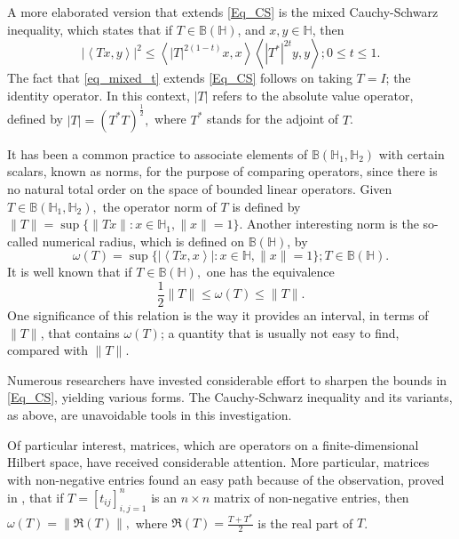 \documentclass[12pt,twoside,reqno]{amsart}
\numberwithin{equation}{section}
\begin{document}
A more elaborated version that extends \eqref{Eq_CS} is the  mixed Cauchy-Schwarz inequality, which states that if $T\in\mathbb{B}(\mathbb{H})$, and $x,y\in\mathbb{H}$, then \cite{kato}
\begin{equation}\label{eq_mixed_t}
{{\left| \left\langle Tx,y \right\rangle  \right|}^{2}}\le \left\langle {{\left| T \right|}^{2\left( 1-t \right)}}x,x \right\rangle \left\langle {{\left| {{T}^{*}} \right|}^{2t}}y,y \right\rangle; 0\leq t\leq 1.
\end{equation}
The fact that \eqref{eq_mixed_t} extends \eqref{Eq_CS} follows on taking $T=I$; the identity operator. In this context, $|T|$ refers to the absolute value operator, defined by $|T|=(T^*T)^{\frac{1}{2}},$ where $T^*$ stands for the adjoint of $T$.

It has been a common practice to associate elements of $\mathbb{B}(\mathbb{H}_1,\mathbb{H}_2)$ with certain scalars, known as norms, for the purpose of comparing operators, since there is no natural total order on the space of bounded linear operators. Given $T\in\mathbb{B}(\mathbb{H}_1,\mathbb{H}_2),$ the operator norm of $T$  is defined by $\|T\|=\sup\{\|Tx\|:x\in\mathbb{H}_1,\|x\|=1\}.$ Another interesting norm is the so-called numerical radius, which is defined on $\mathbb{B}(\mathbb{H})$, by
\[\omega(T)=\sup\{|\left<Tx,x\right>|:x\in\mathbb{H},\|x\|=1\}; T\in\mathbb{B}(\mathbb{H}).\]
It is well known that if $T\in\mathbb{B}(\mathbb{H}),$ one has the equivalence \cite[Theorem 1.3-1]{Gustafson_Book_1997}
\begin{equation}\label{Eq_Equiv}
\frac{1}{2}\|T\|\leq\omega(T)\leq \|T\|.
\end{equation}
One significance of this relation is the way it provides an interval, in terms of $\|T\|$, that contains $\omega(T)$; a quantity that is usually not easy to find, compared with $\|T\|.$ 

Numerous researchers have invested considerable effort to sharpen the bounds in \eqref{Eq_CS}, yielding various forms. The Cauchy-Schwarz inequality and its variants, as above, are unavoidable tools in this investigation.

Of particular interest, matrices, which are operators on a finite-dimensional Hilbert space, have received considerable attention. More particular, matrices with non-negative entries found an easy path because of the observation, proved in \cite{Goldberg_LAA_1975}, that if $T=[t_{ij}]_{i,j=1}^{n}$ is an $n\times n$ matrix of non-negative entries, then $\omega(T)=\|\Re(T)\|,$ where $\Re(T)=\frac{T+T^*}{2}$ is the real part of $T$. 
\end{document}

